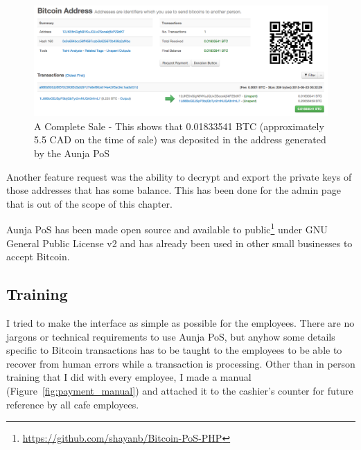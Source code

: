 \begin{figure}
\centering
\includegraphics[width=\linewidth]{fig/complete_sale.png}
  \caption{A Complete Sale - This shows that 0.01833541 BTC (approximately 5.5 CAD on the time of sale) was deposited in the address generated by the Aunja PoS} 
\label{fig:report_page}
\end{figure}


Another feature request was the ability to decrypt and export the private keys of those addresses that has some balance. This has been done for the admin page that is out of the scope of this chapter. 

Aunja PoS has been made open source and available to public\footnote{\url{https://github.com/shayanb/Bitcoin-PoS-PHP}} under GNU General Public License v2 and has already been used in other small businesses to accept Bitcoin.

\subsection{Training}

I tried to make the interface as simple as possible for the employees. There are no jargons or technical requirements to use Aunja PoS, but anyhow some details specific to Bitcoin transactions has to be taught to the employees to be able to recover from human errors while a transaction is processing.
Other than in person training that I did with every employee, I made a manual (Figure~\ref{fig:payment_manual}) and attached it to the cashier's counter for future reference by all cafe employees.

